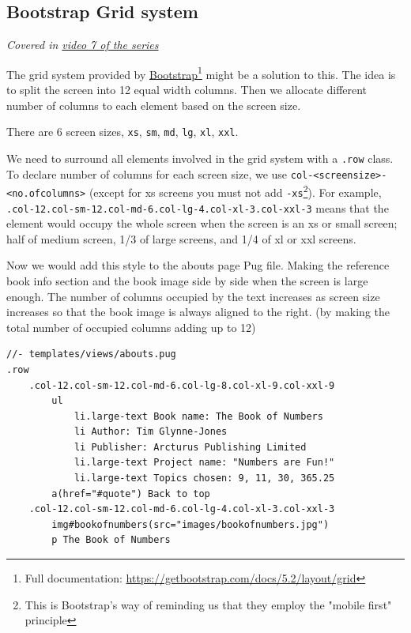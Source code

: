 \subsection{Bootstrap Grid system}
\label{sec:grid}

\textit{Covered in \href{https://www.youtube.com/watch?v=MqXHJmVtEeU&list=PLjGmdnqrOKuYXiu7lgG5HW71jPEUd1XCm&index=9}{video 7 of the series}}
\vspace{6mm}


The grid system provided by \href{https://getbootstrap.com/docs/5.2/layout/grid}{Bootstrap}\footnote{Full documentation: \url{https://getbootstrap.com/docs/5.2/layout/grid}} might be a solution to this. The idea is to split the screen into 12 equal width columns. Then we allocate different number of columns to each element based on the screen size.

There are 6 screen sizes, \texttt{xs}, \texttt{sm}, \texttt{md}, \texttt{lg}, \texttt{xl}, \texttt{xxl}.

We need to surround all elements involved in the grid system with a \texttt{.row} class. To declare number of columns for each screen size, we use \texttt{col-<screensize>-\hfill \break <no.ofcolumns>} (except for xs screens you must not add \texttt{-xs}\footnote{This is Bootstrap's way of reminding us that they employ the "mobile first" principle}). For example, \texttt{.col-12.col-sm-12.col-md-6.col-lg-4.col-xl-3.col-xxl-3} means that the element would occupy the whole screen when the screen is an xs or small screen; half of medium screen, 1/3 of large screens, and 1/4 of xl or xxl screens. 

Now we would add this style to the abouts page Pug file. Making the reference book info section and the book image side by side when the screen is large enough. The number of columns occupied by the text increases as screen size increases so that the book image is always aligned to the right. (by making the total number of occupied columns adding up to 12)
\vspace{6mm}

\begin{lstlisting}[language=pug]
//- templates/views/abouts.pug
.row
	.col-12.col-sm-12.col-md-6.col-lg-8.col-xl-9.col-xxl-9
		ul
			li.large-text Book name: The Book of Numbers
			li Author: Tim Glynne-Jones
			li Publisher: Arcturus Publishing Limited
			li.large-text Project name: "Numbers are Fun!"
			li.large-text Topics chosen: 9, 11, 30, 365.25
		a(href="#quote") Back to top
	.col-12.col-sm-12.col-md-6.col-lg-4.col-xl-3.col-xxl-3
		img#bookofnumbers(src="images/bookofnumbers.jpg")
		p The Book of Numbers
\end{lstlisting}


